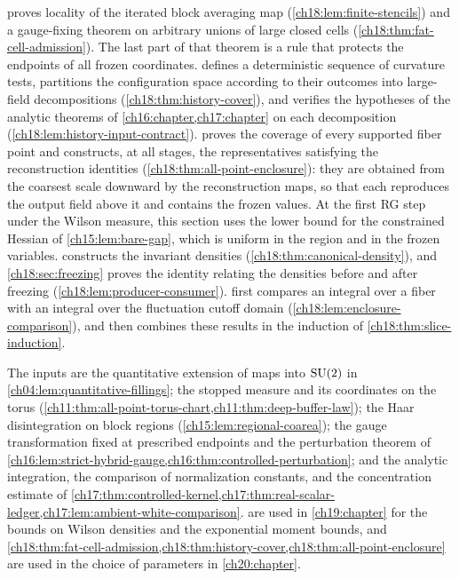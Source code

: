  proves locality of the iterated block averaging map (\cref{ch18:lem:finite-stencils}) and a gauge-fixing theorem on arbitrary unions of large closed cells (\cref{ch18:thm:fat-cell-admission}). The last part of that theorem is a rule that protects the endpoints of all frozen coordinates.  defines a deterministic sequence of curvature tests, partitions the configuration space according to their outcomes into large-field decompositions (\cref{ch18:thm:history-cover}), and verifies the hypotheses of the analytic theorems of \cref{ch16:chapter,ch17:chapter} on each decomposition (\cref{ch18:lem:history-input-contract}).  proves the coverage of every supported fiber point and constructs, at all stages, the representatives satisfying the reconstruction identities (\cref{ch18:thm:all-point-enclosure}): they are obtained from the coarsest scale downward by the reconstruction maps, so that each reproduces the output field above it and contains the frozen values. At the first RG step under the Wilson measure, this section uses the lower bound for the constrained Hessian of \cref{ch15:lem:bare-gap}, which is uniform in the region and in the frozen variables.  constructs the invariant densities (\cref{ch18:thm:canonical-density}), and \cref{ch18:sec:freezing} proves the identity relating the densities before and after freezing (\cref{ch18:lem:producer-consumer}).  first compares an integral over a fiber with an integral over the fluctuation cutoff domain (\cref{ch18:lem:enclosure-comparison}), and then combines these results in the induction of \cref{ch18:thm:slice-induction}.

The inputs are the quantitative extension of maps into $\mathrm{SU}(2)$ in \cref{ch04:lem:quantitative-fillings}; the stopped measure and its coordinates on the torus (\cref{ch11:thm:all-point-torus-chart,ch11:thm:deep-buffer-law}); the Haar disintegration on block regions (\cref{ch15:lem:regional-coarea}); the gauge transformation fixed at prescribed endpoints and the perturbation theorem of \cref{ch16:lem:strict-hybrid-gauge,ch16:thm:controlled-perturbation}; and the analytic integration, the comparison of normalization constants, and the concentration estimate of \cref{ch17:thm:controlled-kernel,ch17:thm:real-scalar-ledger,ch17:lem:ambient-white-comparison}.  are used in \cref{ch19:chapter} for the bounds on Wilson densities and the exponential moment bounds, and \cref{ch18:thm:fat-cell-admission,ch18:thm:history-cover,ch18:thm:all-point-enclosure} are used in the choice of parameters in \cref{ch20:chapter}.

